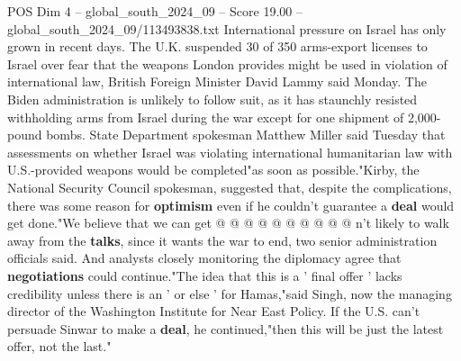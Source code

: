 \begin{textsample}{POS Dim 4 – global\_south\_2024\_09 – Score 19.00 – global\_south\_2024\_09/113493838.txt}
International pressure on Israel has only grown in recent days.
The U.K. suspended 30 of 350 arms-export licenses to Israel over fear that the weapons London provides might be used in violation of international law, British Foreign Minister David Lammy said Monday.
The Biden administration is unlikely to follow suit, as it has staunchly resisted withholding arms from Israel during the war except for one shipment of 2,000-pound bombs.
State Department spokesman Matthew Miller said Tuesday that assessments on whether Israel was violating international humanitarian law with U.S.-provided weapons would be completed"as soon as possible."Kirby, the National Security Council spokesman, suggested that, despite the complications, there was some reason for \textbf{optimism} even if he couldn't guarantee a \textbf{deal} would get done."We believe that we can get @ @ @ @ @ @ @ @ @ @ n't likely to walk away from the \textbf{talks}, since it wants the war to end, two senior administration officials said.
And analysts closely monitoring the diplomacy agree that \textbf{negotiations} could continue."The idea that this is a ' final offer ' lacks credibility unless there is an ' or else ' for Hamas,"said Singh, now the managing director of the Washington Institute for Near East Policy.
If the U.S. can't persuade Sinwar to make a \textbf{deal}, he continued,"then this will be just the latest offer, not the last."

\end{textsample}
